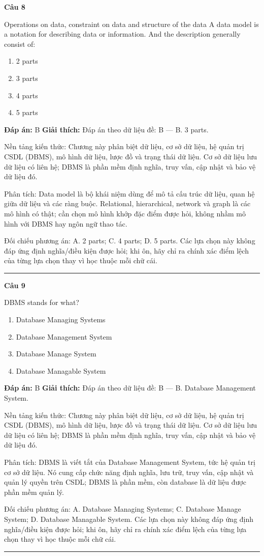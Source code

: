 \documentclass[11pt,a4paper]{article}
\newenvironment{question}[1]{%
  \par\vspace{1em}\noindent\textbf{\large Câu #1}\par\vspace{0.4em}
}{%
  \par\vspace{1em}\hrule\vspace{0.6em}
}
\newenvironment{choices}{%
  \begin{enumerate}[label=\textbf{\Alph*.},leftmargin=2.2em,itemsep=2pt,topsep=3pt]
}{%
  \end{enumerate}
}
\newcommand{\choice}{\item}
\begin{document}
\begin{question}{8}
Operations on data, constraint on data and structure of the data
A data model is a notation for describing data or information. And the description generally consist of:
\begin{choices}
\choice 2 parts
\choice 3 parts
\choice 4 parts
\choice 5 parts
\end{choices}
\textbf{Đáp án:} B
\textbf{Giải thích:} Đáp án theo dữ liệu đề: B — B. 3 parts.

Nền tảng kiến thức: Chương này phân biệt dữ liệu, cơ sở dữ liệu, hệ quản trị CSDL (DBMS), mô hình dữ liệu, lược đồ và trạng thái dữ liệu. Cơ sở dữ liệu lưu dữ liệu có liên hệ; DBMS là phần mềm định nghĩa, truy vấn, cập nhật và bảo vệ dữ liệu đó.

Phân tích: Data model là bộ khái niệm dùng để mô tả cấu trúc dữ liệu, quan hệ giữa dữ liệu và các ràng buộc. Relational, hierarchical, network và graph là các mô hình có thật; cần chọn mô hình khớp đặc điểm được hỏi, không nhầm mô hình với DBMS hay ngôn ngữ thao tác.

Đối chiếu phương án: A. 2 parts; C. 4 parts; D. 5 parts. Các lựa chọn này không đáp ứng định nghĩa/điều kiện được hỏi; khi ôn, hãy chỉ ra chính xác điểm lệch của từng lựa chọn thay vì học thuộc mỗi chữ cái.
\end{question}

\begin{question}{9}
DBMS stands for what?
\begin{choices}
\choice Database Managing Systems
\choice Database Management System
\choice Database Manage System
\choice Database Managable System
\end{choices}
\textbf{Đáp án:} B
\textbf{Giải thích:} Đáp án theo dữ liệu đề: B — B. Database Management System.

Nền tảng kiến thức: Chương này phân biệt dữ liệu, cơ sở dữ liệu, hệ quản trị CSDL (DBMS), mô hình dữ liệu, lược đồ và trạng thái dữ liệu. Cơ sở dữ liệu lưu dữ liệu có liên hệ; DBMS là phần mềm định nghĩa, truy vấn, cập nhật và bảo vệ dữ liệu đó.

Phân tích: DBMS là viết tắt của Database Management System, tức hệ quản trị cơ sở dữ liệu. Nó cung cấp chức năng định nghĩa, lưu trữ, truy vấn, cập nhật và quản lý quyền trên CSDL; DBMS là phần mềm, còn database là dữ liệu được phần mềm quản lý.

Đối chiếu phương án: A. Database Managing Systems; C. Database Manage System; D. Database Managable System. Các lựa chọn này không đáp ứng định nghĩa/điều kiện được hỏi; khi ôn, hãy chỉ ra chính xác điểm lệch của từng lựa chọn thay vì học thuộc mỗi chữ cái.
\end{question}
\end{document}
